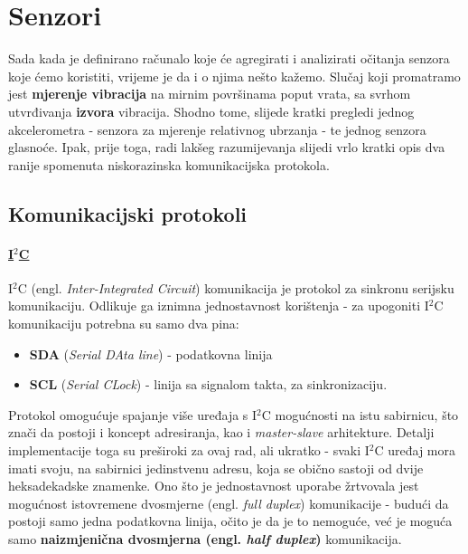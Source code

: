 \documentclass[12pt,a4paper]{article}
\begin{document}

\newpage


\section{Senzori}
	Sada kada je definirano računalo koje će agregirati i analizirati očitanja senzora koje ćemo koristiti, vrijeme je da i o njima nešto kažemo. Slučaj koji promatramo jest \textbf{mjerenje vibracija} na mirnim površinama poput vrata, sa svrhom utvrđivanja \textbf{izvora} vibracija. Shodno tome, slijede kratki pregledi jednog akcelerometra - senzora za mjerenje relativnog ubrzanja - te jednog senzora glasnoće.
	Ipak, prije toga, radi lakšeg razumijevanja slijedi vrlo kratki opis dva ranije spomenuta niskorazinska komunikacijska protokola.

	\subsection{Komunikacijski protokoli}
	\paragraph{\underline{I$^2$C}} %
	\label{par:i2c}
		I$^2$C (engl. \textit{Inter-Integrated Circuit}) komunikacija je protokol za sinkronu serijsku komunikaciju. Odlikuje ga iznimna jednostavnost korištenja - za upogoniti I$^2$C komunikaciju potrebna su samo dva pina:
		\begin{itemize} 
			\item \textbf{SDA} (\textit{Serial DAta line}) - podatkovna linija
			\item \textbf{SCL} (\textit{Serial CLock}) - linija sa signalom takta, za sinkronizaciju.
		\end{itemize}
		Protokol omogućuje spajanje više uređaja s I$^2$C mogućnosti na istu sabirnicu, što znači da postoji i koncept adresiranja, kao i \textit{master-slave} arhitekture. Detalji implementacije toga su preširoki za ovaj rad, ali ukratko - svaki I$^2$C uređaj mora imati svoju, na sabirnici jedinstvenu adresu, koja se obično sastoji od dvije heksadekadske znamenke. 
		Ono što je jednostavnost uporabe žrtvovala jest mogućnost istovremene dvosmjerne (engl. \textit{full duplex}) komunikacije - budući da postoji samo jedna podatkovna linija, očito je da je to nemoguće, već je moguća samo \textbf{naizmjenična dvosmjerna (engl. \textit{half duplex})} komunikacija.
\end{document}
